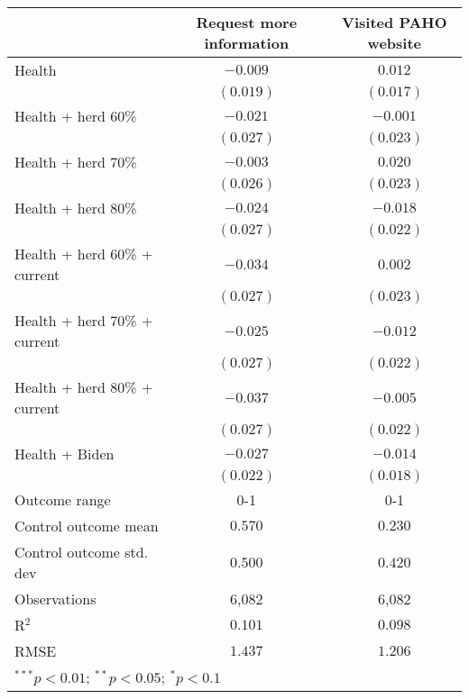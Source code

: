 \begin{table}
\begin{center}
\begin{tabular}{l c c}
\hline
 & Request more information & Visited PAHO website \\
\hline
Health                       & $-0.009$  & $0.012$   \\
                             & $(0.019)$ & $(0.017)$ \\
Health + herd 60\%           & $-0.021$  & $-0.001$  \\
                             & $(0.027)$ & $(0.023)$ \\
Health + herd 70\%           & $-0.003$  & $0.020$   \\
                             & $(0.026)$ & $(0.023)$ \\
Health + herd 80\%           & $-0.024$  & $-0.018$  \\
                             & $(0.027)$ & $(0.022)$ \\
Health + herd 60\% + current & $-0.034$  & $0.002$   \\
                             & $(0.027)$ & $(0.023)$ \\
Health + herd 70\% + current & $-0.025$  & $-0.012$  \\
                             & $(0.027)$ & $(0.022)$ \\
Health + herd 80\% + current & $-0.037$  & $-0.005$  \\
                             & $(0.027)$ & $(0.022)$ \\
Health + Biden               & $-0.027$  & $-0.014$  \\
                             & $(0.022)$ & $(0.018)$ \\
\hline
Outcome range                & 0-1       & 0-1       \\
Control outcome mean         & $0.570$   & $0.230$   \\
Control outcome std. dev     & $0.500$   & $0.420$   \\
Observations                 & 6,082     & 6,082     \\
R$^{2}$                      & $0.101$   & $0.098$   \\
RMSE                         & $1.437$   & $1.206$   \\
\hline
\multicolumn{3}{l}{\scriptsize{$^{***}p<0.01$; $^{**}p<0.05$; $^{*}p<0.1$}}
\end{tabular}
\caption{}
\label{table:Tables and Figures/SI_table22_allinfo_pooled_behav}
\end{center}
\end{table}
